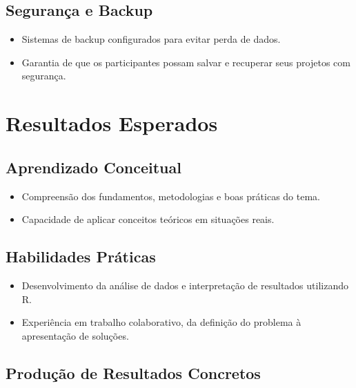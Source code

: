 \documentclass[
  letterpaper,
  DIV=11,
  numbers=noendperiod]{scrreprt}
\providecommand{\tightlist}{%
  \setlength{\itemsep}{0pt}\setlength{\parskip}{0pt}}
\begin{document}
\subsection{Segurança e Backup}\label{seguranuxe7a-e-backup}

\begin{itemize}
\tightlist
\item
  Sistemas de backup configurados para evitar perda de dados.\\
\item
  Garantia de que os participantes possam salvar e recuperar seus
  projetos com segurança.
\end{itemize}

\section{Resultados Esperados}\label{resultados-esperados}

\subsection{Aprendizado Conceitual}\label{aprendizado-conceitual}

\begin{itemize}
\tightlist
\item
  Compreensão dos fundamentos, metodologias e boas práticas do tema.\\
\item
  Capacidade de aplicar conceitos teóricos em situações reais.
\end{itemize}

\subsection{Habilidades Práticas}\label{habilidades-pruxe1ticas}

\begin{itemize}
\tightlist
\item
  Desenvolvimento da análise de dados e interpretação de resultados
  utilizando R.\\
\item
  Experiência em trabalho colaborativo, da definição do problema à
  apresentação de soluções.
\end{itemize}

\subsection{Produção de Resultados
Concretos}\label{produuxe7uxe3o-de-resultados-concretos}
\end{document}
